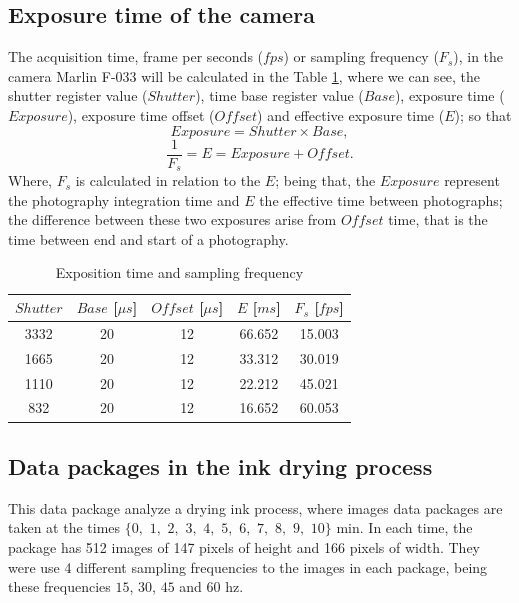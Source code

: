\documentclass[review]{elsarticle}
\begin{document}
\subsection{Exposure time of the camera}
\label{subsec:expositiontime}
The acquisition time,  frame per seconds ($fps$) or sampling frequency ($F_s$), 
in the camera Marlin F-033 will be calculated in the 
 Table \ref{table:1}, where we can see, the shutter register value ($Shutter$), 
time base register value ($Base$),
exposure time ($Exposure$),
exposure time offset ($Offset$) and
effective exposure time ($E$); so that 
\begin{equation}
Exposure= Shutter \times Base,
\end{equation}
\begin{equation}
\frac{1}{F_s}=E= Exposure + Offset.
\end{equation}
Where,  $F_s$ is calculated in relation to the  $E$; being that,
the $Exposure$ represent the photography integration time and $E$ the effective time
between photographs; 
the difference between these two exposures arise from $Offset$ time, 
that is the time between end and start of a photography.
\begin{table}[h!]
\centering
\begin{tabular}{||c c c c c||} 
 \hline
 $Shutter$ &  $Base$ [$\mu s$] & $Offset$ [$\mu s$] & $E$ [$ms$] & $F_s$ [$fps$]\\ [0.5ex] 
 \hline\hline
 3332  & 20  & 12  & 66.652  & 15.003  \\ 
 1665  & 20  & 12  & 33.312  & 30.019  \\ 
 1110  & 20  & 12  & 22.212  & 45.021  \\ 
 832   & 20  & 12  & 16.652  & 60.053  \\ [1ex] 
 \hline
\end{tabular}
\caption{Exposition time and sampling frequency}
\label{table:1}
\end{table}

\subsection{Data packages in the ink drying process}
\label{subsec:data1}
 This data package analyze a drying ink process, 
 where images data packages are taken at the times
 $\{0,$ $1,$ $2,$ $3,$ $4,$ $5,$ $6,$ $7,$ $8,$ $9,$ $10\}$ min. 
 In each time, the package
 has 512 images of 147 pixels of height and 166 pixels of width.
 They were use 4 different sampling frequencies to the images in each package,
 being these frequencies $15$, $30$, $45$ and $60$ hz.
\end{document}
